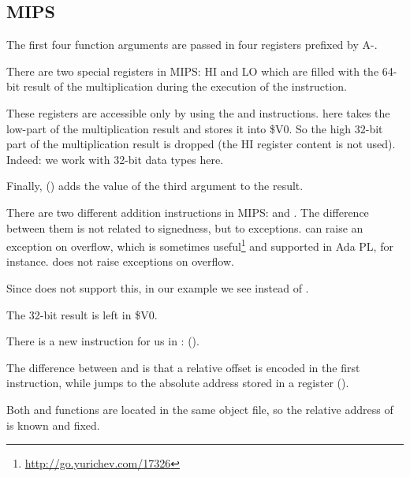 \subsection{MIPS}



The first four function arguments are passed in four registers prefixed by A-.


There are two special registers in MIPS: HI and LO which are filled with the 64-bit result of the multiplication during the execution of the  instruction.

These registers are accessible only by using the  and  instructions.
 here takes the low-part of the multiplication result and stores it into \$V0.
So the high 32-bit part of the multiplication result is dropped (the HI register content is not used).
Indeed: we work with 32-bit \Tint data types here.


Finally,  () adds the value of the third argument to the result.


There are two different addition instructions in MIPS:  and .
The difference between them is not related to signedness, but to exceptions.  can raise an exception on overflow, which is sometimes useful\footnote{\url{http://go.yurichev.com/17326}} and supported in Ada \ac{PL}, for instance.
 does not raise exceptions on overflow.

Since \CCpp does not support this, in our example we see  instead of .

The 32-bit result is left in \$V0.


There is a new instruction for us in \main:  (). 

The difference between  and  is that a relative offset is encoded in the first instruction, 
while  jumps to the absolute address stored in a register ().

Both \ttf and \main functions are located in the same object file, so the relative address of \ttf 
is known and fixed.

